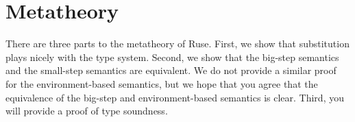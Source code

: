 \documentclass{homework}
\begin{document}

\section{Metatheory}
\label{sec:metatheory}

There are three parts to the metatheory of Ruse.
First, we show that substitution plays nicely with the type system.
Second, we show that the big-step semantics and the small-step semantics are equivalent.
We do not provide a similar proof for the environment-based semantics, but we hope that you agree that the equivalence of the big-step and environment-based semantics is clear.
Third, you will provide a proof of type soundness.
\end{document}
